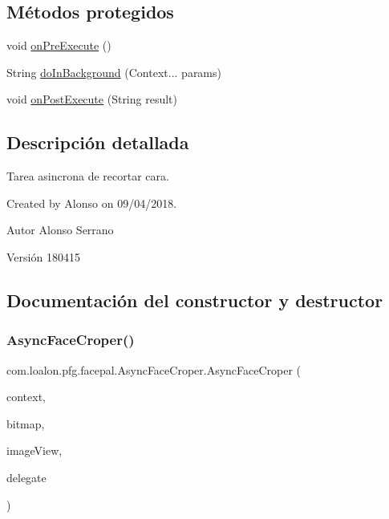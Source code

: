 \subsection*{Métodos protegidos}
\begin{DoxyCompactItemize}
\item 
void \mbox{\hyperlink{classcom_1_1loalon_1_1pfg_1_1facepal_1_1_async_face_croper_a124ec9711412ee0c2748b7ad0ae3d7a2}{on\+Pre\+Execute}} ()
\item 
String \mbox{\hyperlink{classcom_1_1loalon_1_1pfg_1_1facepal_1_1_async_face_croper_ace858d5f1d68f8b06eb58770d26cdcbe}{do\+In\+Background}} (Context... params)
\item 
void \mbox{\hyperlink{classcom_1_1loalon_1_1pfg_1_1facepal_1_1_async_face_croper_ac0b81c27b11613192ae684ea6ffdbf43}{on\+Post\+Execute}} (String result)
\end{DoxyCompactItemize}


\subsection{Descripción detallada}
Tarea asincrona de recortar cara. 

Created by Alonso on 09/04/2018. \begin{DoxyAuthor}{Autor}
Alonso Serrano 
\end{DoxyAuthor}
\begin{DoxyVersion}{Versión}
180415 
\end{DoxyVersion}


\subsection{Documentación del constructor y destructor}
\mbox{\label{classcom_1_1loalon_1_1pfg_1_1facepal_1_1_async_face_croper_a3edb3637aee55bd3d224ff23dc9652d8}} 
\subsubsection{\texorpdfstring{Async\+Face\+Croper()}{AsyncFaceCroper()}}
{\footnotesize\ttfamily com.\+loalon.\+pfg.\+facepal.\+Async\+Face\+Croper.\+Async\+Face\+Croper (\begin{DoxyParamCaption}\item[{Context}]{context,  }\item[{Bitmap}]{bitmap,  }\item[{Image\+View}]{image\+View,  }\item[{\mbox{\hyperlink{interfacecom_1_1loalon_1_1pfg_1_1facepal_1_1_async_face_croper_1_1_async_response}{Async\+Response}}}]{delegate }\end{DoxyParamCaption})}



